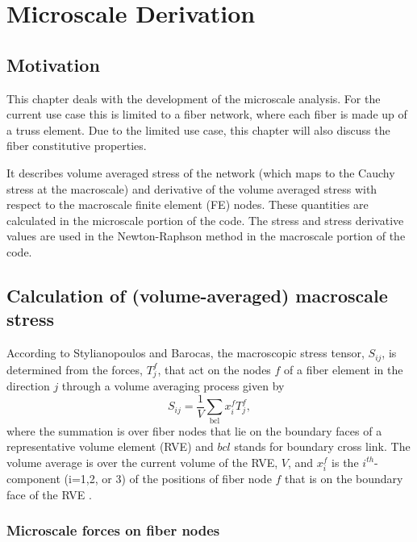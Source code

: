 \chapter{Microscale Derivation}
\section{Motivation}

This chapter deals with the development of the microscale analysis. For the current use case this is limited to a fiber network, where each fiber is made up of a truss element. Due to the limited use case, this chapter will also discuss the fiber constitutive properties. 

It describes volume averaged stress of the network (which maps to the Cauchy stress at the macroscale) and derivative of the volume averaged stress with respect to the macroscale finite element (FE) nodes. These quantities are calculated in the microscale portion of the code. The stress and stress derivative values are used in the Newton-Raphson method in the macroscale portion of the code.


\section{Calculation of (volume-averaged) macroscale stress}
\label{sec:macrostress}

According to Stylianopoulos and Barocas, the macroscopic stress tensor, $S_{ij}$, is determined from the forces, $T_j^f$, that act on the nodes $f$ of a fiber element in the direction $j$ through a volume averaging process given by
%
\begin{equation}
S_{ij} = \frac{1}{V} \sum_{\text{bcl}} x_i^f T_j^f,
\label{S_ij}
\end{equation}
%
where the summation is over fiber nodes that lie on the boundary faces of a representative volume element (RVE) and $bcl$ stands for boundary cross link. The volume average is over the current volume of the RVE, $V$, and $x_i^f$ is the $i^{th}$-component (i=1,2, or 3) of the positions of fiber node $f$ that is on the boundary face of the RVE \cite{Stylianopoulos:2007dp,nemat-nasser_micromechanics:1999}.

\subsection{Microscale forces on fiber nodes}

